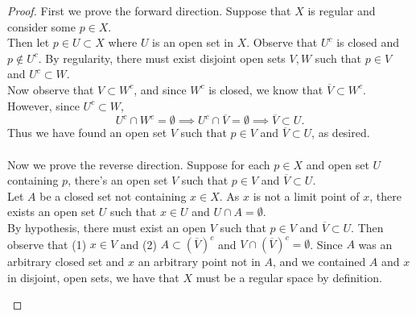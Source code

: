 \documentclass[a4paper,12pt,twoside]{hmcpset}
\begin{document}
\begin{proof}
    First we prove the forward direction.
    Suppose that $X$ is regular and consider some $p \in X$. \\
    Then let $p \in U \subset X$ where $U$ is an open set in $X$. Observe
    that $U^c$ is closed and $p \notin U^c$. By regularity, there must
    exist disjoint open sets $V, W$ such that $p \in V$ and $U^c
    \subset W$.
    \\
    Now observe that $V \subset W^c$, and since $W^c$ is closed, we
    know that $\overline{V} \subset W^c$. However, since $U^c \subset
    W$, 
    \[
      U^c \cap W^c = \emptyset \implies U^c \cap \overline{V} = \emptyset 
      \implies \overline{V} \subset U.  
    \]
    Thus we have found an open set $V$ such that $p \in V$ and
    $\overline{V} \subset U$, as desired.
    \\
    \\
    Now we prove the reverse direction.
    Suppose for each $p \in X$
    and open set $U$ containing $p$, there's an open set $V$ such that
    $p \in V$ and $\overline{V} \subset U$. 
    \\
    Let $A$ be a closed set not containing $x \in X$. As $x$ is not a
    limit point of $x$, there exists an open set $U$ such that $x \in
    U$ and $U \cap A = \emptyset$. 
    \\
    By hypothesis, there must exist an open $V$ such that $p \in V$
    and $\overline{V} \subset U$. Then observe that 
    (1) $ x \in V$ and (2) $A \subset (\overline{V})^c$ and $V \cap
    (\overline{V})^c = \emptyset$. Since $A$ was an arbitrary closed
    set and $x$ an arbitrary point not in $A$, and we contained $A$
    and $x$ in disjoint, open sets, we have that $X$ must
    be a regular space by definition. 
    \\
    \begin{figure}
    \begin{center}
        \hspace{2cm}
\end{center}
\end{figure}
\end{proof}
\end{document}
